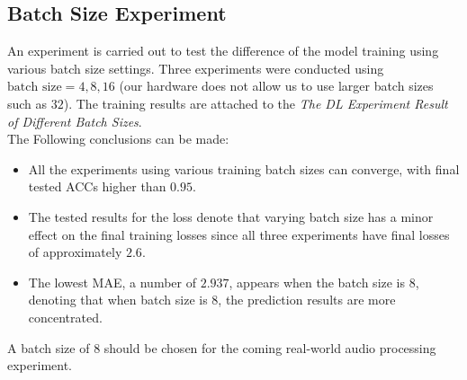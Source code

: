 \subsection*{Batch Size Experiment}
An experiment is carried out to test the difference of the model training using various batch size settings. Three experiments were conducted using \(\text{batch size} = 4,8,16\) (our hardware does not allow us to use larger batch sizes such as \(32\)). The training results are attached to the \textit{The DL Experiment Result of Different Batch Sizes}.\\
The Following conclusions can be made:
\begin{itemize}
    \item All the experiments using various training batch sizes can converge, with final tested ACCs higher than \(0.95\).
    \item The tested results for the loss denote that varying batch size has a minor effect on the final training losses since all three experiments have final losses of approximately \(2.6\).
    \item The lowest MAE, a number of \(2.937\), appears when the batch size is \(8\), denoting that when batch size is \(8\), the prediction results are more concentrated.
\end{itemize}
A batch size of \(8\) should be chosen for the coming real-world audio processing experiment.

